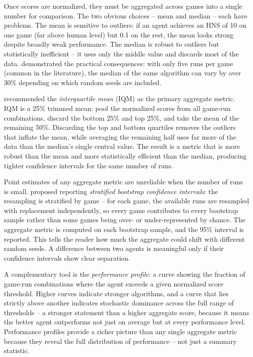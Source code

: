 \smallskip
Once scores are normalized, they must be aggregated across games
into a single number for comparison. The two obvious choices --
mean and median -- each have problems.
The mean is sensitive to outliers: if an agent achieves an HNS of
10 on one game (far above human level) but 0.1 on the rest, the
mean looks strong despite broadly weak performance. The median is
robust to outliers but statistically inefficient -- it uses only
the middle value and discards most of the data.
\citet{agarwal2021deep} demonstrated the practical consequences:
with only five runs per game (common in the literature), the median
of the same algorithm can vary by over 30\% depending on which
random seeds are included.

\smallskip
\citet{agarwal2021deep} recommended the \emph{interquartile mean}
(IQM) as the primary aggregate metric. IQM is a 25\% trimmed mean:
pool the normalized scores from all game-run combinations, discard
the bottom 25\% and top 25\%, and take the mean of the remaining
50\%. Discarding the top and bottom quartiles removes the outliers
that inflate the mean, while averaging the remaining half uses far
more of the data than the median's single central value. The result
is a metric that is more robust than the mean and more statistically
efficient than the median, producing tighter confidence intervals
for the same number of runs.

\smallskip
Point estimates of any aggregate metric are unreliable when the
number of runs is small. \citet{agarwal2021deep} proposed reporting
\emph{stratified bootstrap confidence intervals}: the resampling is
stratified by game -- for each game, the available runs are
resampled with replacement independently, so every game contributes
to every bootstrap sample rather than some games being over- or
under-represented by chance. The aggregate metric is computed on
each bootstrap sample, and the 95\% interval is reported. This
tells the reader how much the aggregate could shift with different
random seeds. A difference between two agents is meaningful only if
their confidence intervals show clear separation.

\smallskip
A complementary tool is the \emph{performance profile}: a curve
showing the fraction of game-run combinations where the agent
exceeds a given normalized score threshold. Higher curves indicate
stronger algorithms, and a curve that lies strictly above another
indicates stochastic dominance across the full range of thresholds
-- a stronger statement than a higher aggregate score, because it
means the better agent outperforms not just on average but at every
performance level. Performance profiles provide a richer picture
than any single
aggregate metric because they reveal the full distribution of
performance -- not just a summary statistic.

